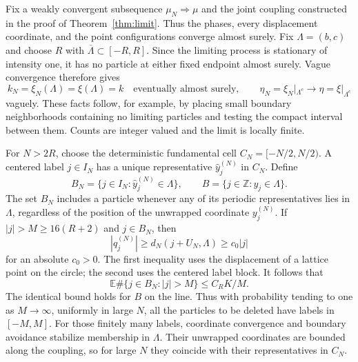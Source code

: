 \documentclass[11pt]{article}
\theoremstyle{remark}\newtheorem{remark}[theorem]{Remark}
\newcommand{\E}{\mathbb E}
\newcommand{\Z}{\mathbb Z}
\begin{document}
Fix a weakly convergent subsequence $\mu_N\Rightarrow\mu$ and
the joint coupling constructed in the proof of
Theorem~\ref{thm:limit}. Thus the phases, every displacement
coordinate, and the point configurations converge almost surely.
Fix $\Lambda=(b,c)$ and choose $R$ with
$\overline\Lambda\subset[-R,R]$. Since the limiting process is
stationary of intensity one, it has no particle at either fixed
endpoint almost surely. Vague convergence therefore gives
\begin{equation}\label{eq:count-stability}
 k_N=\xi_N(\Lambda)=\xi(\Lambda)=k
 \quad\text{eventually almost surely},
 \qquad
 \eta_N=\xi_N|_{\Lambda^c}\longrightarrow
 \eta=\xi|_{\Lambda^c}
\end{equation}
vaguely. These facts follow, for example, by placing small
boundary neighborhoods containing no limiting particles and
testing the compact interval between them. Counts are integer
valued and the limit is locally finite.

For $N>2R$, choose the deterministic fundamental cell
$C_N=[-N/2,N/2)$. A centered label $j\in I_N$ has a unique
representative $\widehat y_j^{(N)}$ in $C_N$. Define
\[
 B_N=\{j\in I_N:\widehat y_j^{(N)}\in\Lambda\},
 \qquad
 B=\{j\in\Z:y_j\in\Lambda\}.
\]
The set $B_N$ includes a particle whenever any of its periodic
representatives lies in $\Lambda$, regardless of the position of
the unwrapped coordinate $y_j^{(N)}$.
If $|j|>M\ge16(R+2)$ and $j\in B_N$, then
\[
 |q_j^{(N)}|\ge d_N(j+U_N,\Lambda)\ge c_0|j|
\]
for an absolute $c_0>0$. The first inequality uses the displacement
of a lattice point on the circle; the second uses the centered
label block. It follows that
\begin{equation}\label{eq:inside-remote}
 \E\#\{j\in B_N:|j|>M\}\le C_RK/M.
\end{equation}
The identical bound holds for $B$ on the line. Thus with
probability tending to one as $M\to\infty$, uniformly in large
$N$, all the particles to be deleted have labels in $[-M,M]$.
For those finitely many labels, coordinate convergence and
boundary avoidance stabilize membership in $\Lambda$. Their
unwrapped coordinates are bounded along the coupling, so for
large $N$ they coincide with their representatives in $C_N$.
\end{document}
